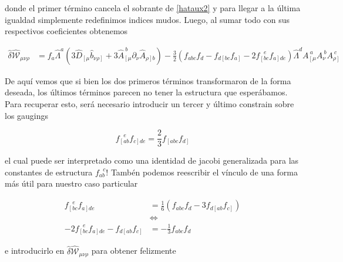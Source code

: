 \documentclass{article}
\numberwithin{equation}{section}
\begin{document}
donde el primer término cancela el sobrante de \ref{hataux2} y para llegar a la última igualdad simplemente redefinimos indices mudos. Luego, al sumar todo con sus respectivos coeficientes obtenemos

\begin{equation}
\begin{aligned}
\hat{\delta}\hat{\mathcal{W}}_{\mu \nu \rho} &= f_a \hat{\Lambda}^a \left( 3\hat{D}_{\left[ \mu \right.} \hat{b}_{\left. \nu \rho \right]} +3 \hat{A}_{\left[\mu\right.}^{\ b} \partial_{\nu} \hat{A}_{\left.\rho\right] b}\right) - \frac{3}{2} \left( f_{a b c}f_d - f_{d \left[b c\right.} f_{\left.a\right]} -2 f_{\left[b c\right.}^{\ \ \ e} f_{\left. a\right] d e} \right) \hat{\Lambda}^d A_{\left[\mu\right.}^{\ a} A_{\nu}^{\ b} A_{\left.\rho\right]}^{\ c}
\end{aligned}
\end{equation} 

De aquí vemos que si bien los dos primeros términos transformaron de la forma deseada, los últimos términos parecen no tener la estructura que esperábamos. Para recuperar esto, será necesario introducir un tercer y último constrain sobre los gaugings 

\begin{equation}\label{gaugingsconstrain3}
f_{\left[a b\right.}^{\ \ \ e} f_{\left. c\right] d e} = \frac{2}{3} f_{\left[ a b c\right.} f_{\left.d\right]}
\end{equation}

el cual puede ser interpretado como una identidad de jacobi generalizada para las constantes de estructura $ f_{a b}^{\ \ \ c} $! Tambén podemos reescribir el vínculo de una forma más útil para nuestro caso particular

\begin{equation}\label{gaugingsconstrain3bis}
\begin{aligned}
f_{\left[b c\right.}^{\ \ \ e} f_{\left. a\right] d e} &=  \frac{1}{6} \left( f_{a b c} f_d - 3 f_{d \left[a b\right.} f_{\left.c\right]}\right)\\
&\Longleftrightarrow\\
-2 f_{\left[b c\right.}^{\ \ \ e} f_{\left. a\right] d e} - f_{d \left[a b\right.} f_{\left.c\right]} &=  -\frac{1}{3} f_{a b c} f_d
\end{aligned}
\end{equation}

e introducirlo en $ \hat{\delta} \hat{\mathcal{W}}_{\mu \nu \rho} $ para obtener felizmente
\end{document}
